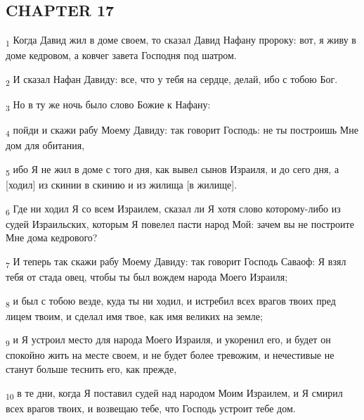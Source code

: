 \subsection{CHAPTER 17}
\begin{tcolorbox}
\textsubscript{1} Когда Давид жил в доме своем, то сказал Давид Нафану пророку: вот, я живу в доме кедровом, а ковчег завета Господня под шатром.
\end{tcolorbox}
\begin{tcolorbox}
\textsubscript{2} И сказал Нафан Давиду: все, что у тебя на сердце, делай, ибо с тобою Бог.
\end{tcolorbox}
\begin{tcolorbox}
\textsubscript{3} Но в ту же ночь было слово Божие к Нафану:
\end{tcolorbox}
\begin{tcolorbox}
\textsubscript{4} пойди и скажи рабу Моему Давиду: так говорит Господь: не ты построишь Мне дом для обитания,
\end{tcolorbox}
\begin{tcolorbox}
\textsubscript{5} ибо Я не жил в доме с того дня, как вывел сынов Израиля, и до сего дня, а [ходил] из скинии в скинию и из жилища [в жилище].
\end{tcolorbox}
\begin{tcolorbox}
\textsubscript{6} Где ни ходил Я со всем Израилем, сказал ли Я хотя слово которому-либо из судей Израильских, которым Я повелел пасти народ Мой: зачем вы не построите Мне дома кедрового?
\end{tcolorbox}
\begin{tcolorbox}
\textsubscript{7} И теперь так скажи рабу Моему Давиду: так говорит Господь Саваоф: Я взял тебя от стада овец, чтобы ты был вождем народа Моего Израиля;
\end{tcolorbox}
\begin{tcolorbox}
\textsubscript{8} и был с тобою везде, куда ты ни ходил, и истребил всех врагов твоих пред лицем твоим, и сделал имя твое, как имя великих на земле;
\end{tcolorbox}
\begin{tcolorbox}
\textsubscript{9} и Я устроил место для народа Моего Израиля, и укоренил его, и будет он спокойно жить на месте своем, и не будет более тревожим, и нечестивые не станут больше теснить его, как прежде,
\end{tcolorbox}
\begin{tcolorbox}
\textsubscript{10} в те дни, когда Я поставил судей над народом Моим Израилем, и Я смирил всех врагов твоих, и возвещаю тебе, что Господь устроит тебе дом.
\end{tcolorbox}
